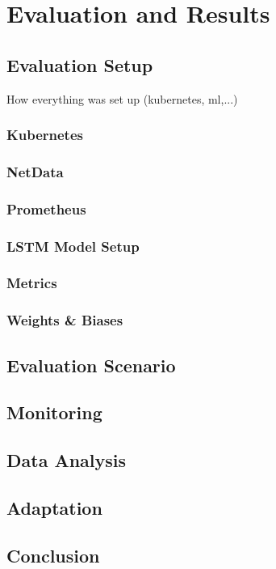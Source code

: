 \chapter{Evaluation and Results}

\section{Evaluation Setup}
  How everything was set up (kubernetes, ml,...)
  \subsection{Kubernetes}
  \subsection{NetData}
  \subsection{Prometheus}
  \subsection{LSTM Model Setup}
  \subsection{Metrics}
  \subsection{Weights \& Biases}
\section{Evaluation Scenario}
\section{Monitoring}
\section{Data Analysis}
\section{Adaptation}
\section{Conclusion}